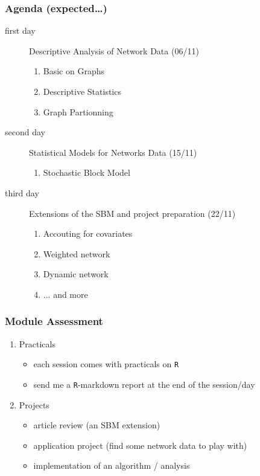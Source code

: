 \documentclass{beamer}\usepackage[]{graphicx}\usepackage[]{color}
\begin{document}
\begin{frame} 
  \frametitle{Agenda (expected\dots)}

  \begin{description}
  \item[first day] Descriptive Analysis of Network Data (06/11)
    \begin{enumerate}
    \item \alert{Basic on Graphs} 
    \item \alert{Descriptive Statistics} 
    \item \alert{Graph Partionning} 
    \end{enumerate}

  \bigskip

  \item[second day] Statistical Models for Networks Data (15/11)
    \begin{enumerate}
    \item \alert{Stochastic Block Model} 
    \end{enumerate}

  \bigskip

  \item[third day] Extensions of the SBM and project preparation (22/11)
    \begin{enumerate}
    \item \alert{Accouting for covariates} 
    \item \alert{Weighted network} 
    \item \alert{Dynamic network} 
    \item \alert{... and more} 
    \end{enumerate}

  \end{description}
    
  \end{frame}

  \begin{frame}
    \frametitle{Module Assessment}

\begin{enumerate}
\item \alert{Practicals}

\begin{itemize}
\item each session comes with practicals on \texttt{R}
\item send me a \texttt{R}-markdown report \alert{at the end of the session/day}
\end{itemize}
\bigskip

\item \alert{Projects}
  
\begin{itemize}
\item article review (an SBM extension)
\item application project (find some network data to play with)
\item implementation of an algorithm / analysis
\end{itemize}

\end{enumerate}
       
\end{frame}
  
\end{document}
